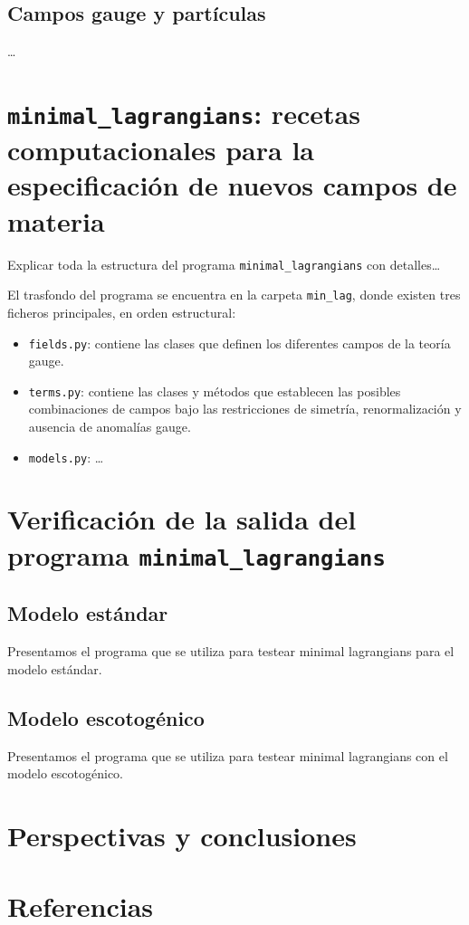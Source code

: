 \documentclass[
                egregdoesnotlikesansseriftitles,
                paper=a4,
                fontsize=13pt,
                DIV=calc]{scrarticle}
\begin{document}
\subsection{Campos gauge y partículas}
\label{sec:org61d3807}
\ldots{}

\section{\texttt{minimal\_lagrangians}: recetas computacionales para la especificación de nuevos campos de materia}
\label{sec:org5d56f62}

Explicar toda la estructura del programa \texttt{minimal\_lagrangians} con detalles\ldots{}

El trasfondo del programa se encuentra en la carpeta \texttt{min\_lag}, donde existen
tres ficheros principales, en orden estructural:
\begin{itemize}
\item \texttt{fields.py}: contiene las clases que definen los diferentes campos de la teoría gauge.
\item \texttt{terms.py}: contiene las clases y métodos que establecen las posibles combinaciones de campos bajo las restricciones de simetría, renormalización y ausencia de anomalías gauge.
\item \texttt{models.py}: \ldots{}
\end{itemize}

\section{Verificación de la salida del programa \texttt{minimal\_lagrangians}}
\label{sec:org23d7686}
\subsection{Modelo estándar}
\label{sec:org1a24f50}
Presentamos el programa que se utiliza para testear minimal lagrangians para el modelo estándar.
\subsection{Modelo escotogénico}
\label{sec:orgc54d82e}
Presentamos el programa que se utiliza para testear minimal lagrangians con el modelo escotogénico.

\section{Perspectivas y conclusiones}
\label{sec:org299f159}

\section{Referencias}
\label{sec:org167ac07}
\printbibliography
\end{document}
